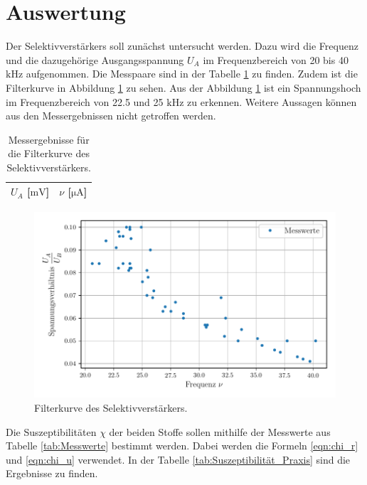 \section{Auswertung}
\label{sec:Auswertung}
Der Selektivverstärkers soll zunächst untersucht werden.
Dazu wird die Frequenz und die dazugehörige Ausgangsspannung $U_A$ im Frequenzbereich von 20 bis 40 $\si{\kilo\hertz}$ aufgenommen.
Die Messpaare sind in der Tabelle \ref{tab:Messergebnisse} zu finden.
Zudem ist die Filterkurve in Abbildung \ref{fig:filterkurve} zu sehen.
Aus der Abbildung \ref{fig:filterkurve} ist ein Spannungshoch im Frequenzbereich von 22.5 und 25 $\si{\kilo\hertz}$ zu erkennen.
Weitere Aussagen können aus den Messergebnissen nicht getroffen werden.

\begin{table}
  \centering
  \caption{Messergebnisse für die Filterkurve des Selektivverstärkers.}
  \label{tab:Messergebnisse}
  \begin{tabular}{c c}
    \toprule
    {$U_A$ [$\si{\milli\volt}$]} & {$\nu$ [$\si{\micro\ampere}$]}\\
    \midrule
    
    \bottomrule
  \end{tabular}
\end{table}

\begin{figure}
  \centering
  \caption{Filterkurve des Selektivverstärkers.}
  \label{fig:filterkurve}
  \includegraphics{content/filterkurve.pdf}
\end{figure}

Die Suszeptibilitäten $\chi$ der beiden Stoffe sollen mithilfe der Messwerte aus Tabelle \ref{tab:Messwerte} bestimmt werden.
Dabei werden die Formeln \ref{eqn:chi_r} und \ref{eqn:chi_u} verwendet.
In der Tabelle \ref{tab:Suszeptibilität_Praxis} sind die Ergebnisse zu finden.

